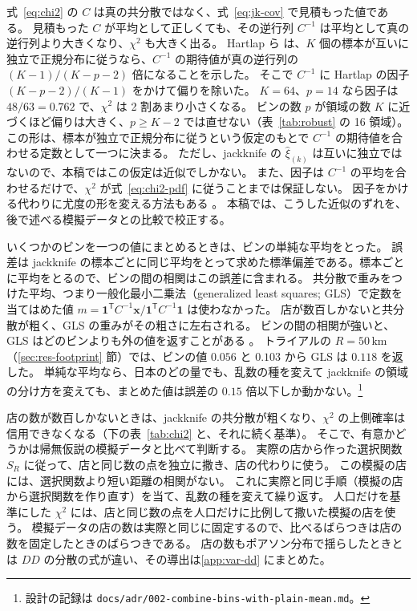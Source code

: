 \documentclass[a4paper,11pt]{ltjsarticle}
\newcommand{\code}[1]{\textcolor{codecolor}{\texttt{#1}}}
\begin{document}
式~\eqref{eq:chi2} の $C$ は真の共分散ではなく、式~\eqref{eq:jk-cov} で見積もった値である。
見積もった $C$ が平均として正しくても、その逆行列 $C^{-1}$ は平均として真の逆行列より大きくなり、$\chi^2$ も大きく出る。
Hartlap ら \cite{Hartlap2007} は、$K$ 個の標本が互いに独立で正規分布に従うなら、$C^{-1}$ の期待値が真の逆行列の $(K-1)/(K-p-2)$ 倍になることを示した。
そこで $C^{-1}$ に Hartlap の因子 $(K-p-2)/(K-1)$ をかけて偏りを除いた。
$K = 64$、$p = 14$ なら因子は $48/63 = 0.762$ で、$\chi^2$ は 2 割あまり小さくなる。
ビンの数 $p$ が領域の数 $K$ に近づくほど偏りは大きく、$p \ge K-2$ では直せない（表~\ref{tab:robust} の 16 領域）。
この形は、標本が独立で正規分布に従うという仮定のもとで $C^{-1}$ の期待値を合わせる定数として一つに決まる。
ただし、jackknife の $\hat\xi_{(k)}$ は互いに独立ではないので、本稿ではこの仮定は近似でしかない。
また、因子は $C^{-1}$ の平均を合わせるだけで、$\chi^2$ が式~\eqref{eq:chi2-pdf} に従うことまでは保証しない。
因子をかける代わりに尤度の形を変える方法もある \cite{SellentinHeavens2016}。
本稿では、こうした近似のずれを、後で述べる模擬データとの比較で校正する。

いくつかのビンを一つの値にまとめるときは、ビンの単純な平均をとった。
誤差は jackknife の標本ごとに同じ平均をとって求めた標準偏差である。標本ごとに平均をとるので、ビンの間の相関はこの誤差に含まれる。
共分散で重みをつけた平均、つまり一般化最小二乗法（generalized least squares; GLS）で定数を当てはめた値 $m = \bm{1}^{\mathsf T} C^{-1} \bm{x} / \bm{1}^{\mathsf T} C^{-1} \bm{1}$ は使わなかった。
店が数百しかないと共分散が粗く、GLS の重みがその粗さに左右される。
ビンの間の相関が強いと、GLS はどのビンよりも外の値を返すことがある \cite{DAgostini1994}。
トライアルの $R = 50\,\mathrm{km}$（\ref{sec:res-footprint} 節）では、ビンの値 $0.056$ と $0.103$ から GLS は $0.118$ を返した。
単純な平均なら、日本のどの量でも、乱数の種を変えて jackknife の領域の分け方を変えても、まとめた値は誤差の $0.15$ 倍以下しか動かない。\footnote{設計の記録は \code{docs/adr/002-combine-bins-with-plain-mean.md}。}

店の数が数百しかないときは、jackknife の共分散が粗くなり、$\chi^2$ の上側確率は信用できなくなる（下の表~\ref{tab:chi2} と、それに続く基準）。
そこで、有意かどうかは帰無仮説の模擬データと比べて判断する。
実際の店から作った選択関数 $S_R$ に従って、店と同じ数の点を独立に撒き、店の代わりに使う。
この模擬の店には、選択関数より短い距離の相関がない。
これに実際と同じ手順（模擬の店から選択関数を作り直す）を当て、乱数の種を変えて繰り返す。
人口だけを基準にした $\chi^2$ には、店と同じ数の点を人口だけに比例して撒いた模擬の店を使う。
模擬データの店の数は実際と同じに固定するので、比べるばらつきは店の数を固定したときのばらつきである。
店の数もポアソン分布で揺らしたときとは $DD$ の分散の式が違い、その導出は\ref{app:var-dd} にまとめた。
\end{document}
